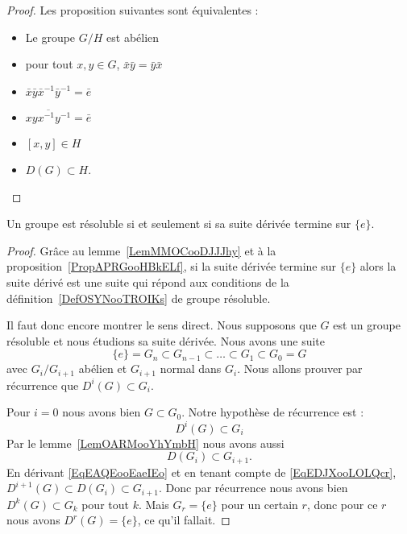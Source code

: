 \begin{proof}
    Les proposition suivantes sont équivalentes :
    \begin{itemize}
        \item Le groupe \( G/H\) est abélien
        \item pour tout \( x,y\in G\), \( \bar x\bar y=\bar y\bar x\)
        \item $\bar x\bar y\bar x^{-1}\bar y^{-1}=\bar e$
        \item \( \overline{ xyx^{-1}y^{-1} }=\bar e\)
        \item \( [x,y]\in H\)
        \item \( D(G)\subset H\).
    \end{itemize}
\end{proof}

\begin{proposition} \label{PropRWYZooTarnmm}
    Un groupe est résoluble si et seulement si sa suite dérivée termine sur \( \{ e \}\).
\end{proposition}

\begin{proof}
    Grâce au lemme~\ref{LemMMOCooDJJJhy} et à la proposition~\ref{PropAPRGooHBkELf}, si la suite dérivée termine sur \( \{ e \}\) alors la suite dérivé est une suite qui répond aux conditions de la définition~\ref{DefOSYNooTROIKs} de groupe résoluble.

    Il faut donc encore montrer le sens direct. Nous supposons que \( G\) est un groupe résoluble et nous étudions sa suite dérivée. Nous avons une suite
    \begin{equation}
        \{ e \}=G_n\subset G_{n-1}\subset\ldots\subset G_1\subset G_0=G
    \end{equation}
    avec \( G_i/G_{i+1}\) abélien et \( G_{i+1}\) normal dans \( G_i\). Nous allons prouver par récurrence que \( D^i(G)\subset G_i\).

    Pour \( i=0\) nous avons bien \( G\subset G_0\). Notre hypothèse de récurrence est :
    \begin{equation}    \label{EqEAQEooEaeIEo}
        D^i(G)\subset G_i
    \end{equation}
    Par le lemme~\ref{LemOARMooYhYmbH} nous avons aussi
    \begin{equation}    \label{EqEDJXooLOLQcr}
        D(G_i)\subset G_{i+1}.
    \end{equation}
    En dérivant \eqref{EqEAQEooEaeIEo} et en tenant compte de \eqref{EqEDJXooLOLQcr}, \( D^{i+1}(G)\subset D(G_i)\subset G_{i+1}\). Donc par récurrence nous avons bien \( D^k(G)\subset G_k\) pour tout \( k\). Mais \( G_r=\{ e \}\) pour un certain \( r\), donc pour ce \( r\) nous avons \( D^r(G)=\{ e \}\), ce qu'il fallait.
\end{proof}


